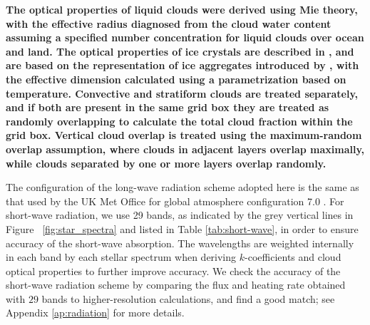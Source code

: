 \documentclass[11pt,numberedappendix,twocolappendix,]{emulateapj}
\def\revise#1{{\bf #1}}
\begin{document}
\revise{The optical properties of liquid clouds were derived using Mie theory, with the effective radius diagnosed from the cloud water content assuming a specified number concentration for liquid clouds over ocean and land. 
The optical properties of ice crystals are described in \citet{Edwards2007}, and are based on the representation of ice aggregates introduced by \citet{Baran2001}, with the effective dimension calculated using a parametrization based on temperature. 
Convective and stratiform clouds are treated separately, and if both are present in the same grid box they are treated as randomly overlapping to calculate the total cloud fraction within the grid box. 
Vertical cloud overlap is treated using the maximum-random overlap assumption, where clouds in adjacent layers overlap maximally, while clouds separated by one or more layers overlap randomly. }

The configuration of the long-wave radiation scheme adopted here is the same as that used by the UK Met Office for global atmosphere configuration 7.0 \citep[GA7.0;][]{Walters2017}. 
For short-wave radiation, we use 29 bands, as indicated by the grey vertical lines in Figure ~\ref{fig:star_spectra} and listed in Table \ref{tab:short-wave}, in order to ensure accuracy of the short-wave absorption. 
The wavelengths are weighted internally in each band by each stellar spectrum when deriving $k$-coefficients and cloud optical properties to further improve accuracy. 
We check the accuracy of the short-wave radiation scheme by comparing the flux and heating rate obtained with $29$ bands to higher-resolution calculations, and find a good match; see Appendix \ref{ap:radiation} for more details. 
\end{document}
